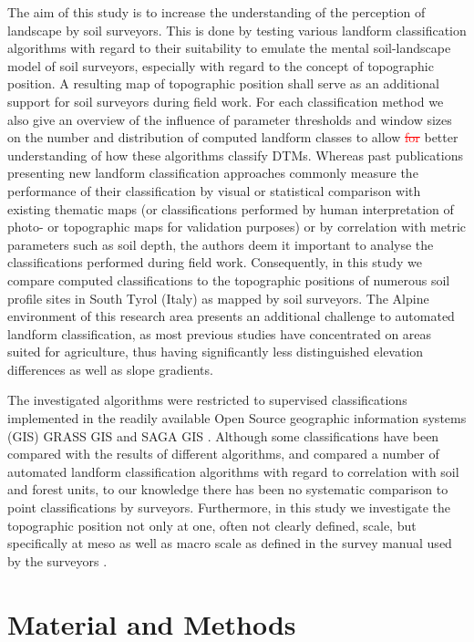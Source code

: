 \documentclass[preprint,12pt,authoryear]{elsarticle}
\begin{document}
The aim of this study is to increase the understanding of the perception of landscape by soil surveyors. This is done by testing various landform classification algorithms with regard to their suitability to emulate the mental soil-landscape model of soil surveyors, especially with regard to the concept of topographic position. A resulting map of topographic position shall serve as an additional support for soil surveyors during field work. For each classification method we also give an overview of the influence of parameter thresholds and window sizes on the number and distribution of computed landform classes to allow \textcolor{red}{\sout{for}} better understanding of how these algorithms classify DTMs. Whereas past publications presenting new landform classification approaches commonly measure the performance of their classification by visual or statistical comparison with existing thematic maps (or classifications performed by human interpretation of photo- or topographic maps for validation purposes) or by correlation with metric parameters such as soil depth, the authors deem it important to analyse the classifications performed during field work. Consequently, in this study we compare computed classifications to the topographic positions of numerous soil profile sites in South Tyrol (Italy) as mapped by soil surveyors. The Alpine environment of this research area presents an additional challenge to automated landform classification, as most previous studies have concentrated on areas suited for agriculture, thus having significantly less distinguished elevation differences as well as slope gradients.

The investigated algorithms were restricted to supervised classifications implemented in the readily available Open Source geographic information systems (GIS) GRASS GIS \citep{GRASS_GIS_software} and SAGA GIS \citep{conrad2015system}.  Although some classifications have been compared with the results of different algorithms, and \cite{Barka2011} compared a number of automated landform classification algorithms with regard to correlation with soil and forest units, to our knowledge there has been no systematic comparison to point classifications by surveyors. Furthermore, in this study we investigate the topographic position not only at one, often not clearly defined, scale, but specifically at meso as well as macro scale as defined in the survey manual used by the surveyors \citep{Englisch1998}.

\section{Material and Methods}
\end{document}
